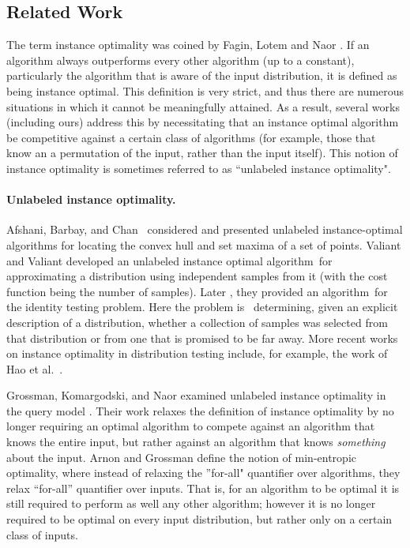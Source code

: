 \documentclass[11pt]{article}
\numberwithin{equation}{section}
\newcommand{\1}{\mathbf{1}}
\begin{document}
\subsection{Related Work}
The term instance optimality was coined by Fagin, Lotem and Naor \cite{FaginLN03}. If an algorithm always outperforms every other algorithm (up to a constant), particularly the algorithm that is aware of the input distribution, it is defined as being instance optimal. This definition is very strict, and thus there are numerous situations in which it cannot be meaningfully attained. As a result, several works (including ours) address this by necessitating that an instance optimal algorithm be competitive against a certain class of algorithms (for example, those that know an a permutation of the input, rather than the input itself). This notion of instance optimality is sometimes referred to as ``unlabeled instance optimality".

\paragraph{Unlabeled instance optimality.} Afshani, Barbay, and Chan~\cite{AfshaniBC17} considered and presented unlabeled instance-optimal algorithms for locating the convex hull and set maxima of a set of points. Valiant and Valiant \cite{ValiantV16} developed an unlabeled instance optimal algorithm for approximating a distribution using independent samples from it (with the cost function being the number of samples). Later \cite{ValiantV17}, they provided an algorithm for the identity testing problem. Here the problem is  determining, given an explicit description of a distribution, whether a collection of samples was selected from that distribution or from one that is promised to be far away. More recent works on instance optimality in distribution testing include, for example, the work of Hao et al.~\cite{HaoOSW18,HaoOrlitsky2020}.

Grossman, Komargodski, and Naor examined unlabeled instance optimality in the query model \cite{GrossmanKN20}. Their work relaxes the definition of instance optimality by no longer requiring an optimal algorithm to compete against an algorithm that knows the entire input, but rather against an algorithm that knows \emph{something} about the input. Arnon and Grossman \cite{ArnonG21} define the notion of min-entropic optimality, where instead of relaxing the ''for-all" quantifier over algorithms, they relax “for-all” quantifier over inputs. That is, for an
algorithm to be optimal it is still required to perform as well any other algorithm; however it is no longer required to be optimal on every input distribution, but rather only on a certain class of inputs. 
\end{document}
